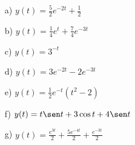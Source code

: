 \begin{resp}
 \begin{itemize}
  \item[a)] $y(t)=\frac{5}{2}e^{-2t}+\frac{1}{2}$
    \item[b)] $y(t)=\frac{1}{4}e^{t}+\frac{7}{4}e^{-3t}$
     \item[c)] $y(t)=3^{-t}$
        \item[d)] $y(t)=3e^{-2t}-2e^{-3t}$
        \item[e)] $y(t)=\frac{1}{2}e^{-t}(t^2-2)$
        \item[f)] $y(t)= t \sen t + 3 \cos t +4 \sen t$
        \item[g)] $y(t)=\frac{e^{3t}}{2} + \frac{5e^{-4t}}{2} + \frac{e^{-3t}}{2}$
        \end{itemize}
\end{resp}



